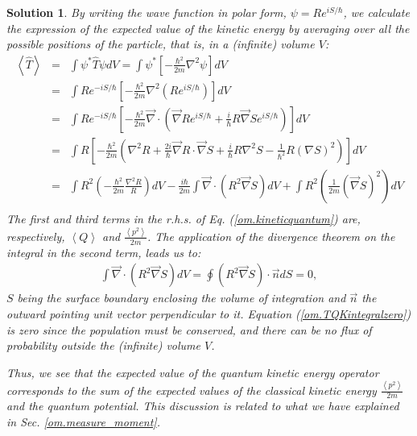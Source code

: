 \documentclass[nofootinbib, secnumarabic, amsmath, nobibnotes,10pt,aps,pra]{revtex4-1}
\newtheorem{solution}{Solution}
\newcommand{\sref}[1]{Sec. \ref{#1}}
\newcommand{\eref}[1]{Eq. (\ref{#1})}
\newcommand{\Eref}[1]{Equation (\ref{#1})}
\begin{document}
\begin{solution}

By writing the wave function in polar form, $\psi = R e^{iS/\hbar}$, we calculate the expression of the expected value of the kinetic energy by averaging over all the possible positions of the particle, that is, in a (infinite) volume $V$:
\begin{eqnarray}
\left\langle \hat{T} \right\rangle &=& \int \psi^* \hat{T} \psi dV = \int \psi^* \left[-\frac{\hbar^2}{2m} \nabla^2 \psi \right] dV \nonumber\\
&=& \int R e^{-iS/\hbar} \left[-\frac{\hbar^2}{2m} \nabla^2 (R e^{iS/\hbar}) \right] dV \nonumber\\
&=& \int R e^{-iS/\hbar} \left[-\frac{\hbar^2}{2m} \vec{\nabla} \cdot \left( \vec{\nabla} R e^{iS/\hbar} + \frac{i}{\hbar} R \vec{\nabla} S e^{iS/\hbar} \right) \right] dV \nonumber\\
&=& \int R \!\left[-\frac{\hbar^2}{2m}\! \left(\! \nabla^2 R +
\frac{2i}{\hbar} \vec{\nabla} R \cdot \vec{\nabla} S + \frac{i}{\hbar} R \nabla^2 S - \frac{1}{\hbar^2} R (\nabla S)^2 \!\right)\! \right] dV \nonumber\\
&=& \int R^2 \left(-\frac{\hbar^2}{2m} \frac{\nabla^2 R}{R} \right)
dV - \frac{i \hbar}{2m} \int \vec{\nabla} \cdot \left( R^2
\vec{\nabla} S\right) dV + \int R^2 \left( \frac{1}{2m} (\vec{\nabla} S)^2 \right) dV\nonumber\\
\label{om.kineticquantum}
\end{eqnarray}
The first and third terms in the r.h.s. of \eref{om.kineticquantum} are, respectively, $\left\langle Q \right\rangle$ and $\frac{\left\langle p^2 \right\rangle}{2m}$. The application of the divergence theorem on the integral in the second term, leads us to:
\begin{eqnarray}
\int \vec{\nabla} \cdot \left( R^2 \vec{\nabla} S\right) dV = \oint \left( R^2 \vec{\nabla} S \right) \cdot \vec{n} dS = 0, 
\label{om.TQKintegralzero}
\end{eqnarray}
$S$ being the surface boundary enclosing the volume of integration
and $\vec{n}$ the outward pointing unit vector perpendicular to it.
\Eref{om.TQKintegralzero} is zero since the population must be
conserved, and there can be no flux of probability outside the
(infinite) volume $V$.

Thus, we see that the expected value of the quantum kinetic energy operator corresponds to the sum of the expected values of the classical kinetic energy $\frac{\left\langle p^2 \right\rangle}{2m}$ and the quantum potential. This discussion is related to what we have explained in \sref{om.measure_moment}.

\end{solution}
\end{document}
